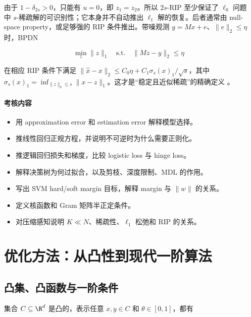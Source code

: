 由于 \(1-\delta_{2s}>0\)，只能有 \(u=0\)，即 \(z_1=z_2\)。所以 \(2s\)-RIP 至少保证了 \(\ell_0\) 问题中 \(s\)-稀疏解的可识别性；它本身并不自动推出 \(\ell_1\) 解的恢复。后者通常由 null-space property，或足够强的 RIP 条件推出。带噪观测 \(y=Mx+e\)、\(\|e\|_2\le\eta\) 时，BPDN

\[
  \min_z\|z\|_1\quad\text{s.t.}\quad\|Mz-y\|_2\le\eta
\]

在相应 RIP 条件下满足 \(\|\hat x-x\|_2\le C_0\eta+C_1\sigma_s(x)_1/\sqrt{s}\)，其中 \(\sigma_s(x)_1=\inf_{\|z\|_0\le s}\|x-z\|_1\)。这才是“稳定且近似稀疏”的精确定义 \parencite{candes2006compressive}。

\paragraph{考核内容}

\begin{itemize}
  \item 用 approximation error 和 estimation error 解释模型选择。
  \item 推线性回归正规方程，并说明不可逆时为什么需要正则化。
  \item 推逻辑回归损失和梯度，比较 logistic loss 与 hinge loss。
  \item 解释决策树为何过拟合，以及剪枝、深度限制、MDL 的作用。
  \item 写出 SVM hard/soft margin 目标，解释 margin 与 \(\|w\|\) 的关系。
  \item 定义核函数和 Gram 矩阵半正定条件。
  \item 对压缩感知说明 \(K\ll N\)、稀疏性、\(\ell_1\) 松弛和 RIP 的关系。
\end{itemize}

\section{优化方法：从凸性到现代一阶算法}


\subsection{凸集、凸函数与一阶条件}


集合 \(C\subseteq\R^d\) 是凸的，表示任意 \(x,y\in C\) 和 \(\theta\in[0,1]\)，都有

